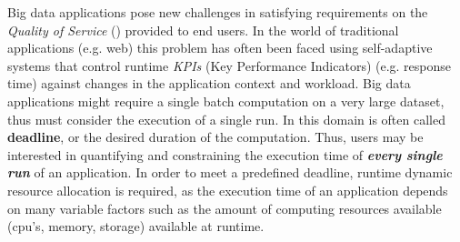 Big data applications pose new challenges in satisfying requirements on the \textit{Quality of Service} (\qos) provided to end users. In the world of traditional applications (e.g. web) this problem has often been faced using self-adaptive systems that control runtime \textit{KPIs} (Key Performance Indicators) (e.g.  response time) against changes in the application context and workload. %
Big data applications might require a single batch computation on a very large dataset, thus \qos must consider the execution of a single run. In this domain \qos is often called \textbf{deadline}, or the desired duration of the computation. Thus, users may be interested in quantifying and constraining the execution time of \textit{\textbf{every single run}} of an application. 
In order to meet a predefined deadline, runtime dynamic resource allocation is required, as the execution time of an application depends on many variable factors such as the amount of computing resources available (cpu's, memory, storage) available at runtime. %

